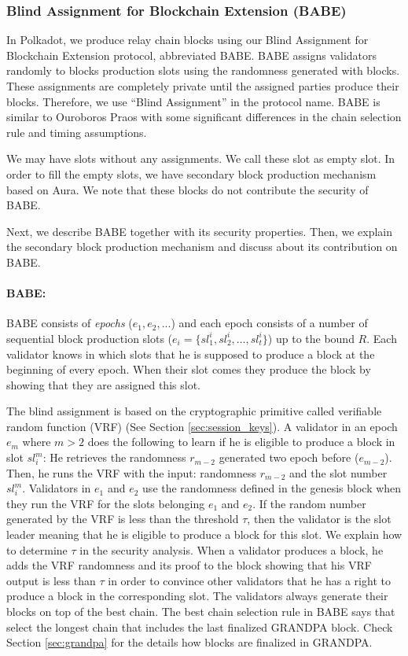 \subsubsection{Blind Assignment for Blockchain Extension (BABE)}

In Polkadot, we produce relay chain blocks using our Blind Assignment for Blockchain Extension protocol, abbreviated BABE. BABE assigns validators randomly to blocks production slots using  the randomness generated with blocks. These assignments are completely private until the assigned parties produce their blocks. Therefore, we use ``Blind Assignment'' in the protocol name. BABE is similar to Ouroboros Praos \cite{praos} with some significant differences in the chain selection rule and timing assumptions.

We may have slots without any assignments. We call these slot as empty slot. In order to fill the empty slots, we have secondary block production mechanism based on Aura. We note that these blocks do not contribute the security of BABE. 

Next, we describe BABE together with its security properties. Then, we explain the secondary block production mechanism and discuss about its contribution on BABE.

\paragraph{BABE:}

BABE consists of \emph{epochs} ($e_1,e_2,...$) and each epoch consists of a number of sequential block production slots (\(e_i = \{sl^i_{1}, sl^i_{2},\ldots,sl^i_{t}\}\)) up to the bound  $R$.
Each validator knows in which slots that he is supposed to produce a block at the beginning of every epoch. When their slot comes they produce the block by showing that they are assigned this slot.

The blind assignment is based on the cryptographic primitive called verifiable random function (VRF) \cite{vrf} (See Section \ref{sec:session_keys}). 
A validator in an epoch $e_m$ where $m > 2$ does the following to learn if he is eligible to produce a block in slot $sl_i^m$: He retrieves the randomness $r_{m-2}$ generated two epoch before ($e_{m-2}$). Then, he runs the VRF with the input:  randomness $r_{m-2}$ and the slot number $ sl_i^m $.  Validators in $e_1$ and $e_2$ use the randomness defined in the genesis block when they run the VRF for the slots belonging $e_1$ and $e_2$. If the random number generated by the VRF is less than the threshold $ \tau $, then the validator is the slot leader meaning that he is eligible to produce a block for this slot. We explain how to determine $\tau$ in the security analysis. 
When a validator produces a block, he adds the VRF randomness and its proof to the block showing that his VRF output is less than $\tau$  in order to convince other validators that he has a right to produce a block in the corresponding slot. The validators always generate their blocks on top of the best chain.
The best chain selection rule in BABE says that select the longest chain that includes the last finalized GRANDPA block. Check Section \ref{sec:grandpa} for the details how blocks are finalized in GRANDPA. 

